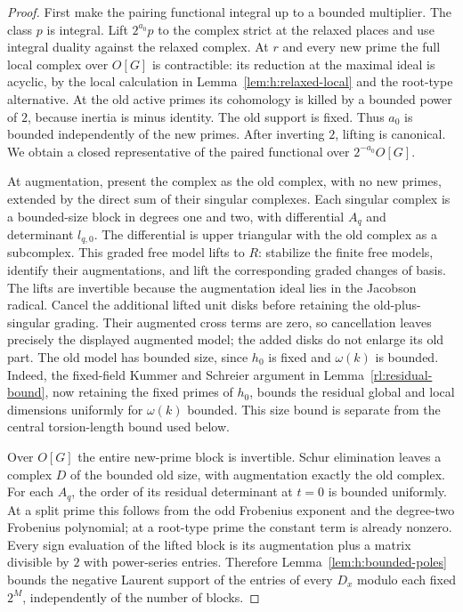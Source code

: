 \begin{proof}
First make the pairing functional integral up to a bounded multiplier.
The class $p$ is integral. Lift $2^{a_0}p$ to the complex strict at
the relaxed places and use integral duality against the relaxed
complex. At $r$ and every new prime the full local complex over
$O[G]$ is contractible: its reduction at the maximal ideal is acyclic,
by the local calculation in Lemma~\ref{lem:h:relaxed-local} and the
root-type alternative. At the old active primes its cohomology is
killed by a bounded power of $2$, because inertia is minus identity.
The old support is fixed. Thus $a_0$ is bounded independently of the
new primes. After inverting $2$, lifting is canonical. We obtain a
closed representative of the paired functional over
$2^{-a_0}O[G]$.

At augmentation, present the complex as the old complex, with no new
primes, extended by the direct sum of their singular complexes.
Each singular complex is a bounded-size block in degrees one and two,
with differential $A_q$ and determinant $l_{q,0}$. The differential is
upper triangular with the old complex as a subcomplex. This graded
free model lifts to $R$: stabilize the finite free models, identify their
augmentations, and lift the corresponding graded changes of basis.
The lifts are invertible because the augmentation ideal lies in the
Jacobson radical. Cancel the additional lifted unit disks before
retaining the old-plus-singular grading. Their augmented cross terms
are zero, so cancellation leaves precisely the displayed augmented
model; the added disks do not enlarge its old part.
The old model has bounded size, since $h_0$ is fixed and
$\omega(k)$ is bounded.
Indeed, the fixed-field Kummer and Schreier argument in
Lemma~\ref{rl:residual-bound}, now retaining the fixed primes of $h_0$,
bounds the residual global and local dimensions uniformly for
$\omega(k)$ bounded. This size bound is separate from the central
torsion-length bound used below.

Over $O[G]$ the entire new-prime block is invertible. Schur elimination
leaves a complex $D$ of the bounded old size, with augmentation exactly
the old complex. For each $A_q$, the order of its residual determinant
at $t=0$ is bounded uniformly. At a split prime this follows from the
odd Frobenius exponent and the degree-two Frobenius polynomial; at a
root-type prime the constant term is already nonzero. Every sign
evaluation of the lifted block is its augmentation plus a matrix
divisible by $2$ with power-series entries. Therefore
Lemma~\ref{lem:h:bounded-poles} bounds the negative Laurent support of
the entries of every $D_x$ modulo each fixed $2^M$, independently of
the number of blocks.


\end{proof}
